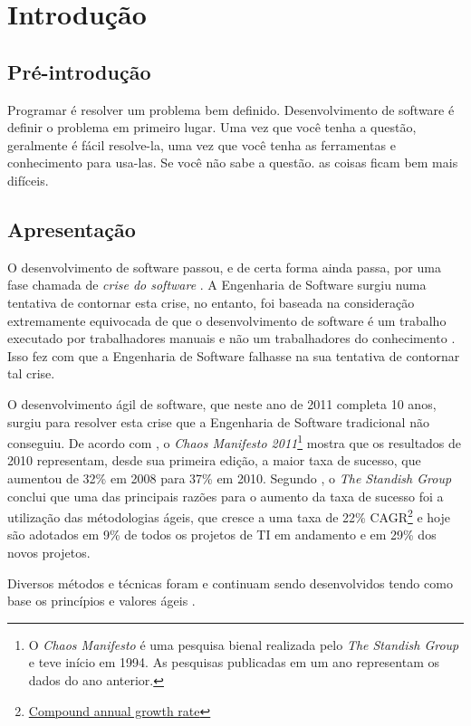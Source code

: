 \chapter{Introdução}

\section{Pré-introdução}

Programar é resolver um problema bem definido. Desenvolvimento de software é
definir o problema em primeiro lugar. Uma vez que você tenha a questão,
geralmente é fácil resolve-la, uma vez que você tenha as ferramentas e
conhecimento para usa-las. Se você não sabe a questão. as coisas ficam bem mais
difíceis. \cite{ProgrammingIsEasySoftwareDevelopmentIsHard}

\section{Apresentação}

O desenvolvimento de software passou, e de certa forma ainda passa, por uma fase
chamada de \emph{crise do software} \cite{HumbleProgrammer}. A Engenharia de
Software surgiu \cite{NaurRandell} numa tentativa de contornar esta crise, no
entanto, foi baseada na consideração extremamente equivocada de que o
desenvolvimento de software é um trabalho executado por trabalhadores manuais e
não um trabalhadores do conhecimento \cite[38]{XPTeles}. Isso fez com que a
Engenharia de Software falhasse na sua tentativa de contornar tal crise.

O desenvolvimento ágil de software, que neste ano de 2011 completa 10 anos,
surgiu \cite{AgileManifesto} para resolver esta crise que a Engenharia de
Software tradicional não conseguiu. De acordo com \cite{PMNetworkFailureDrop}, o
\textit{Chaos Manifesto 2011}\footnote{O \textit{Chaos Manifesto} é uma pesquisa
bienal realizada pelo \textit{The Standish Group} e teve início em 1994. As
pesquisas publicadas em um ano representam os dados do ano anterior.} mostra que
os resultados de 2010 representam, desde sua primeira edição, a maior taxa de
sucesso, que aumentou de 32\% em 2008 para 37\% em 2010. Segundo
\cite{ResumoChaosReport}, o \textit{The Standish Group} conclui que uma das
principais razões para o aumento da taxa de sucesso foi a utilização das
métodologias ágeis, que cresce a uma taxa de 22\%
CAGR\footnote{\href{http://en.wikipedia.org/wiki/Compound_annual_growth_rate}
{Compound annual growth rate}} e hoje são adotados em 9\% de todos os projetos
de TI em andamento e em 29\% dos novos projetos.

Diversos métodos e técnicas foram e continuam sendo desenvolvidos tendo como
base os princípios e valores ágeis \cite{BDDRodrigo}.
